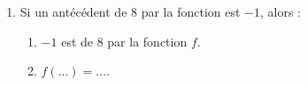 {\begin{Exercice}
\begin{enumerate}
\begin{enumerate}
        \item 5 est \phantom{un antécédent} de 3 par la fonction \( f \).
        \item \( f(...) = ... \).
    \end{enumerate}
    \item Si un antécédent de 8 par la fonction est $ -1 $, alors :
    \begin{enumerate}
        \item $ -1 $ est \phantom{un antécédent} de 8 par la fonction \( f \).
        \item \( f(...) = ... \).
    \end{enumerate}
\end{enumerate}
\vspace{-0.5cm}
\end{Exercice}

}

